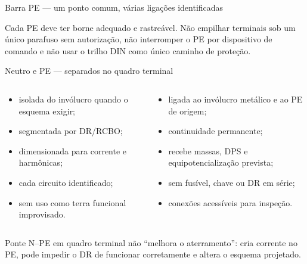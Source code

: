 \begin{frame}{Barra PE — um ponto comum, várias ligações identificadas}
\centering
{}
\vspace{2mm}
\begin{caixaObs}
Cada PE deve ter borne adequado e rastreável. Não empilhar terminais sob um único parafuso sem autorização, não interromper o PE por dispositivo de comando e não usar o trilho DIN como único caminho de proteção.
\end{caixaObs}
\end{frame}

\begin{frame}{Neutro e PE — separados no quadro terminal}
\small
\begin{columns}[T,onlytextwidth]
\begin{caixaNorma}[title=Barra N]
\begin{itemize}
\item isolada do invólucro quando o esquema exigir;
\item segmentada por DR/RCBO;
\item dimensionada para corrente e harmônicas;
\item cada circuito identificado;
\item sem uso como terra funcional improvisado.
\end{itemize}
\end{caixaNorma}
\begin{caixaNorma}[title=Barra PE]
\begin{itemize}
\item ligada ao invólucro metálico e ao PE de origem;
\item continuidade permanente;
\item recebe massas, DPS e equipotencialização prevista;
\item sem fusível, chave ou DR em série;
\item conexões acessíveis para inspeção.
\end{itemize}
\end{caixaNorma}
\end{columns}
\begin{caixaAt}
Ponte N--PE em quadro terminal não “melhora o aterramento”: cria corrente no PE, pode impedir o DR de funcionar corretamente e altera o esquema projetado.
\end{caixaAt}
\end{frame}

